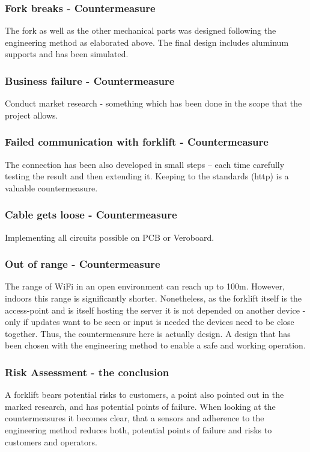 \documentclass[../report.tex]{subfiles}
\begin{document}
\subsubsection{Fork breaks - Countermeasure}
The fork as well as the other mechanical parts was designed following the engineering method 
as elaborated above. The final design includes aluminum supports and has been simulated. 
\subsubsection{Business failure - Countermeasure}
Conduct market research - something which has been done in the scope that the project allows.

\subsubsection{Failed communication with forklift - Countermeasure}
The connection has been also developed in small steps – each time carefully testing the result
and then extending it. Keeping to the standards (http) is a valuable countermeasure. 
\subsubsection{Cable gets loose - Countermeasure}
Implementing all circuits possible on PCB or Veroboard.

\subsubsection{Out of range - Countermeasure}
The range of WiFi in an open environment can reach up to 100m. However, indoors this range is significantly
shorter. Nonetheless, as the forklift itself is the access-point and is itself hosting the server
it is not depended on another device - only if updates want to be seen or input is needed the devices need to be 
close together. Thus, the countermeasure here is actually design. A design that has been chosen with the engineering
method to enable a safe and working operation.

\subsubsection{Risk Assessment - the conclusion}
A forklift bears potential risks to customers, a point also pointed out in the marked research, and has potential points of failure. 
When looking at the countermeasures it becomes clear, that a sensors and adherence to the engineering
method reduces both, potential points of failure and risks to customers and operators.
\end{document}
